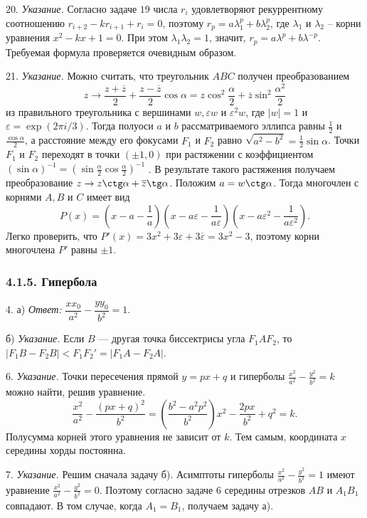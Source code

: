 20. \textit{Указание.} Согласно задаче $19$ числа $r_i$ удовлетворяют рекуррентному соотношению $r_{i+2} - k r_{i+1} + r_i = 0$, поэтому $r_p = a \lambda_1^p + b \lambda_2^p$, где $\lambda_1$ и $\lambda_2$ -- корни уравнения $x^2 - kx + 1 = 0$. При этом $\lambda_1 \lambda_2 = 1$, значит, $r_p = a \lambda^p + b \lambda^{-p}$. Требуемая формула проверяется очевидным образом.

21. \textit{Указание.} Можно считать, что треугольник $ABC$ получен преобразованием
\[
	z \to \frac{z + \overline z}{2} + \frac{z - \overline z}{2} \cos \alpha = z \cos^2 \frac{\alpha}{2} + \overline z \sin^2 \frac{\alpha^2}{2}
\]
из правильного треугольника с вершинами $w, \varepsilon w$ и $\varepsilon^2 w$, где $|w| = 1$ и $\varepsilon = \exp(2\pi i / 3)$. Тогда полуоси $a$ и $b$ рассматриваемого эллипса равны $\frac{1}{2}$ и $\frac{\cos\alpha}{2}$, а расстояние между его фокусами $F_1$ и $F_2$ равно $\sqrt{a^2 - b^2} = \frac{1}{2} \sin \alpha$. 
Точки $F_1$ и $F_2$ переходят в точки $(\pm 1, 0)$ при растяжении с коэффициентом $(\sin\alpha)^{-1} = \left(\sin \frac{\alpha}{2} \cos \frac{\alpha}{2}\right)^{-1}$ . В результате такого растяжения получаем преобразование $z \to z \ctg \alpha + \overline z \tg \alpha$. Положим $a = w \ctg \alpha$. Тогда многочлен с корнями $A, B$ и $C$ имеет вид
\[
	P(x) = (x - a - \frac{1}{a})(x - a \varepsilon - \frac{1}{a \varepsilon})(x - a \varepsilon^2 - \frac{1}{a \varepsilon^2}).
\]
Легко проверить, что $P'(x) = 3x^2 + 3\varepsilon + 3 \overline \varepsilon = 3x^2 - 3$, поэтому корни многочлена $P'$ равны $\pm 1$.

\subsubsection*{4.1.5. Гипербола}

4. а) \textit{Ответ:} $\dfrac{xx_0 }{a^2} - \dfrac{yy_0}{b^2} = 1$.

б) \textit{Указание.} Если $B$ — другая точка биссектрисы угла $F_1AF_2$, то $|F_1B - F_2B| < F_1 F_2' = |F_1A - F_2A|$.

6. \textit{Указание.} Точки пересечения прямой $y = px + q$ и гиперболы $\frac{x^2}{a^2} - \frac{y^2}{b^2} = k$ можно найти, решив уравнение.
\[
	\frac{x^2}{a^2} - \frac{(px + q)^2}{b^2} = \left(\frac{b^2 - a^2 p^2}{b^2}\right)x^2 - \frac{2px}{b^2} + q^2 = k.
\]
Полусумма корней этого уравнения не зависит от $k$. Тем самым, координата $x$ середины хорды постоянна.

7. \textit{Указание.} Решим сначала задачу б). Асимптоты гиперболы $\frac{x^2}{a^2} - \frac{y^2}{b^2} = 1$ имеют уравнение $\frac{x^2}{a^2} - \frac{y^2}{b^2} = 0$. Поэтому согласно задаче $6$ середины отрезков $AB$ и $A_1B_1$ совпадают. В том случае, когда $A_1 = B_1$, получаем задачу а).

